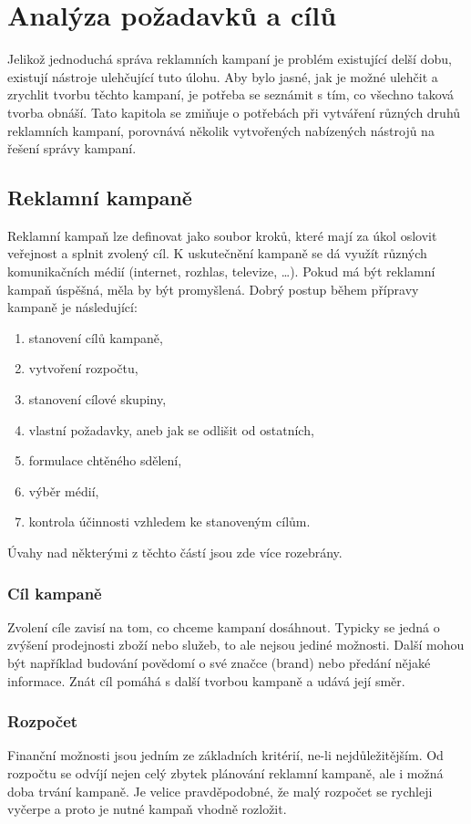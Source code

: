 \chapter{Analýza požadavků a cílů}
\label{chap:analysis}
Jelikož jednoduchá správa reklamních kampaní je problém existující delší dobu, existují nástroje ulehčující tuto úlohu. Aby bylo jasné, jak
je možné ulehčit a zrychlit tvorbu těchto kampaní, je potřeba se seznámit s tím, co všechno taková tvorba obnáší.
Tato kapitola se zmiňuje o potřebách při vytváření různých druhů reklamních kampaní, porovnává několik vytvořených nabízených
nástrojů na řešení správy kampaní.

\section{Reklamní kampaně}
Reklamní kampaň lze definovat jako soubor kroků, které mají za úkol oslovit veřejnost a splnit zvolený cíl. \cite{campaigns:creation}
K uskutečnění kampaně se dá využít různých komunikačních
médií (internet, rozhlas, televize, \ldots).
Pokud má být reklamní kampaň úspěšná, měla by být promyšlená. Dobrý postup během přípravy kampaně je následující:
\begin{enumerate}
    \item stanovení cílů kampaně,
    \item vytvoření rozpočtu,
    \item stanovení cílové skupiny,
    \item vlastní požadavky, aneb jak se odlišit od ostatních,
    \item formulace chtěného sdělení,
    \item výběr médií,
    \item kontrola účinnosti vzhledem ke stanoveným cílům.
\end{enumerate}
\cite{vysekalova:reklama}
Úvahy nad některými z těchto částí jsou zde více rozebrány.


\subsection{Cíl kampaně}
Zvolení cíle zavisí na tom, co chceme kampaní dosáhnout. Typicky se jedná o zvýšení prodejnosti zboží nebo služeb, to ale nejsou jediné možnosti. Další mohou být například budování
povědomí o své značce (brand) nebo předání nějaké informace. Znát cíl pomáhá s další tvorbou kampaně a udává její směr.

\subsection{Rozpočet}
Finanční možnosti jsou jedním ze základních kritérií, ne-li nejdůležitějším. Od rozpočtu se odvíjí nejen celý zbytek plánování reklamní kampaně, ale i možná
doba trvání kampaně. Je velice pravděpodobné, že malý rozpočet se rychleji vyčerpe a proto je nutné kampaň vhodně rozložit.

